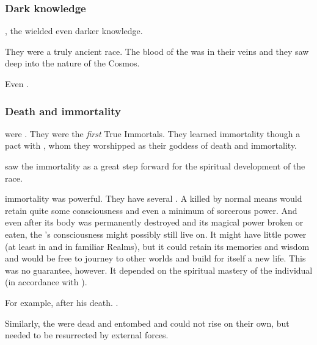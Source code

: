 \subsubsection{Dark knowledge}
, {the \dragons wielded even darker knowledge}. 

They were a truly ancient race.
The blood of the \xss was in their veins and they saw deep into the nature of the Cosmos.

Even \Criseis {}. 







\subsubsection{Death and immortality}
\Dragons{} were . 
They were the \emph{first} True Immortals. 
They learned immortality though a pact with , whom they worshipped as their goddess of death and immortality.

 saw the \Draconic immortality as a great step forward for the spiritual development of the \ophidian race. 

\Draconian immortality was powerful. 
They have several . 
A \dragon killed by normal means would retain quite some consciousness and even a minimum of sorcerous power. 
And even after its body was permanently destroyed and its magical power broken or eaten, the \dragon's consciousness might possibly still live on. 
It might have little power (at least in \Miith and in familiar Realms), but it could retain its memories and wisdom and would be free to journey to other worlds and build for itself a new life. 
This was no guarantee, however. 
It depended on the spiritual mastery of the individual \dragon (in accordance with ). 

For example, \Sethicus {} after his death. 
\Nexagglachel {}. 

Similarly, the  were dead and entombed and could not rise on their own, but needed to be resurrected by external forces. 

